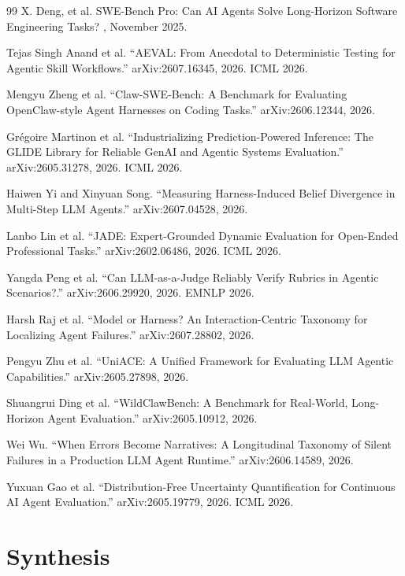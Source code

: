 \documentclass[11pt]{book}
\begin{document}
\begin{thebibliography}{99}
X. Deng, et al.
\newblock SWE-Bench Pro: Can AI Agents Solve Long-Horizon Software Engineering Tasks?
, November 2025.


Tejas Singh Anand et al.
``AEVAL: From Anecdotal to Deterministic Testing for Agentic Skill Workflows.''
arXiv:2607.16345, 2026. ICML 2026.

Mengyu Zheng et al.
``Claw-SWE-Bench: A Benchmark for Evaluating OpenClaw-style Agent Harnesses on Coding Tasks.''
arXiv:2606.12344, 2026.

Grégoire Martinon et al.
``Industrializing Prediction-Powered Inference: The GLIDE Library for Reliable GenAI and Agentic Systems Evaluation.''
arXiv:2605.31278, 2026. ICML 2026.

Haiwen Yi and Xinyuan Song.
``Measuring Harness-Induced Belief Divergence in Multi-Step LLM Agents.''
arXiv:2607.04528, 2026.

Lanbo Lin et al.
``JADE: Expert-Grounded Dynamic Evaluation for Open-Ended Professional Tasks.''
arXiv:2602.06486, 2026. ICML 2026.

Yangda Peng et al.
``Can LLM-as-a-Judge Reliably Verify Rubrics in Agentic Scenarios?.''
arXiv:2606.29920, 2026. EMNLP 2026.

Harsh Raj et al.
``Model or Harness? An Interaction-Centric Taxonomy for Localizing Agent Failures.''
arXiv:2607.28802, 2026.

Pengyu Zhu et al.
``UniACE: A Unified Framework for Evaluating LLM Agentic Capabilities.''
arXiv:2605.27898, 2026.

Shuangrui Ding et al.
``WildClawBench: A Benchmark for Real-World, Long-Horizon Agent Evaluation.''
arXiv:2605.10912, 2026.

Wei Wu.
``When Errors Become Narratives: A Longitudinal Taxonomy of Silent Failures in a Production LLM Agent Runtime.''
arXiv:2606.14589, 2026.

Yuxuan Gao et al.
``Distribution-Free Uncertainty Quantification for Continuous AI Agent Evaluation.''
arXiv:2605.19779, 2026. ICML 2026.
\end{thebibliography}
\part{Synthesis}
\end{document}
